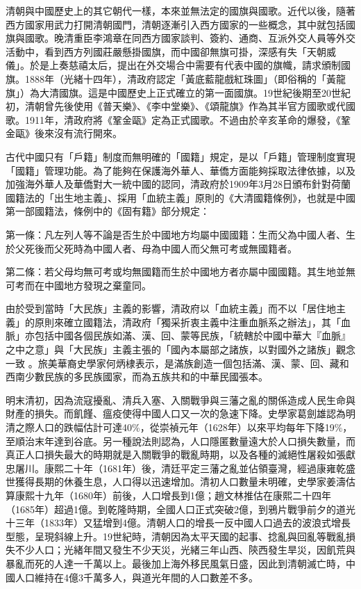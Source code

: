 清朝與中國歷史上的其它朝代一樣，本來並無法定的國旗與國歌。近代以後，隨著西方國家用武力打開清朝國門，清朝逐漸引入西方國家的一些概念，其中就包括國旗與國歌。晚清重臣李鴻章在同西方國家談判、簽約、通商、互派外交人員等外交活動中，看到西方列國莊嚴懸掛國旗，而中國卻無旗可掛，深感有失「天朝威儀」。於是上奏慈禧太后，提出在外交場合中需要有代表中國的旗幟，請求頒制國旗。1888年（光緒十四年），清政府認定「黃底藍龍戲紅珠圖」（即俗稱的「黃龍旗」）為大清國旗。這是中國歷史上正式確立的第一面國旗。19世紀後期至20世紀初，清朝曾先後使用《普天樂》、《李中堂樂》、《頌龍旗》作為其半官方國歌或代國歌。1911年，清政府將《鞏金甌》定為正式國歌。不過由於辛亥革命的爆發，《鞏金甌》後來沒有流行開來。

古代中國只有「戶籍」制度而無明確的「國籍」規定，是以「戶籍」管理制度實現「國籍」管理功能。為了能夠在保護海外華人、華僑方面能夠採取法律依據，以及加強海外華人及華僑對大一統中國的認同，清政府於1909年3月28日頒布針對荷蘭國籍法的「出生地主義」、採用「血統主義」原則的《大清國籍條例》，也就是中國第一部國籍法，條例中的《固有籍》部分規定：

第一條：凡左列人等不論是否生於中國地方均屬中國國籍：生而父為中國人者、生於父死後而父死時為中國人者、母為中國人而父無可考或無國籍者。

第二條：若父母均無可考或均無國籍而生於中國地方者亦屬中國國籍。其生地並無可考而在中國地方發現之棄童同。

由於受到當時「大民族」主義的影響，清政府以「血統主義」而不以「居住地主義」的原則來確立國籍法，清政府「獨采折衷主義中注重血脈系之辦法」，其「血脈」亦包括中國各個民族如滿、漢、回、蒙等民族，「統轄於中國中華大『血脈』之中之意」與「大民族」主義主張的「國內本屬部之諸族，以對國外之諸族」觀念一致 。旅美華裔史學家何炳棣表示，是滿族創造一個包括滿、漢、蒙、回、藏和西南少數民族的多民族國家，而為五族共和的中華民國張本。

明末清初，因為流寇擾亂、清兵入塞、入關戰爭與三藩之亂的關係造成人民生命與財產的損失。而飢饉、瘟疫使得中國人口又一次的急速下降。史學家葛劍雄認為明清之際人口的跌幅估計可達40\%，從崇禎元年（1628年）以來平均每年下降19\%，至順治末年達到谷底。另一種說法則認為，人口隱匿數量遠大於人口損失數量，而真正人口損失最大的時期就是入關戰爭的戰亂時期，以及各種的滅絕性屠殺如張獻忠屠川。康熙二十年（1681年）後，清廷平定三藩之亂並佔領臺灣，經過康雍乾盛世獲得長期的休養生息，人口得以迅速增加。清初人口數量未明確，史學家姜濤估算康熙十九年（1680年）前後，人口增長到1億；趙文林推估在康熙二十四年（1685年）超過1億。到乾隆時期，全國人口正式突破2億，到鴉片戰爭前夕的道光十三年（1833年）又猛增到4億。清朝人口的增長一反中國人口過去的波浪式增長型態，呈現斜線上升。19世紀時，清朝因為太平天國的起事、捻亂與回亂等戰亂損失不少人口；光緒年間又發生不少天災，光緒三年山西、陝西發生旱災，因飢荒與暴亂而死的人達一千萬以上。最後加上海外移民風氣日盛，因此到清朝滅亡時，中國人口維持在4億3千萬多人，與道光年間的人口數差不多。


